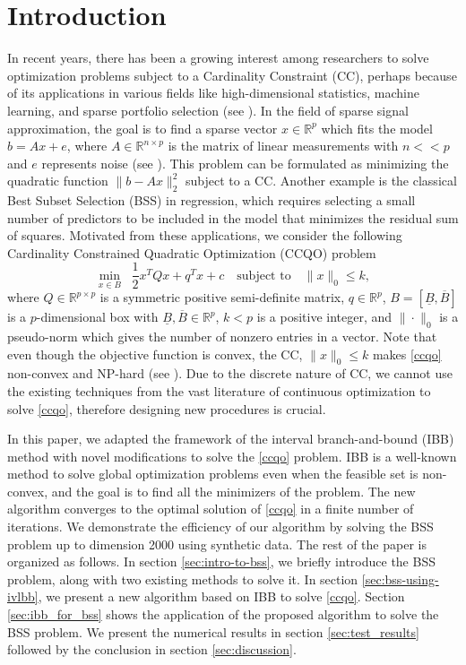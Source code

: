 \documentclass[10pt, letterpaper]{article}
\begin{document}
\section{Introduction}
In recent years, there has been a growing interest among researchers to solve optimization problems subject to a Cardinality Constraint (CC), perhaps because of its applications in various fields like high-dimensional statistics, machine learning, and sparse portfolio selection (see \cite{tillman2024cardinality}). 
In the field of sparse signal approximation, the goal is to find a sparse vector $x \in \mathbb{R}^{p}$ which fits the model $b=Ax+e$, where $A\in \mathbb{R}^{n \times p}$ is the matrix of linear measurements with $n << p$ and $e$ represents noise (see \cite{blumensath2008iterative}). This problem can be formulated as minimizing the quadratic function $\|b-Ax \|_{2}^{2}$ subject to a CC. Another example is the classical Best Subset Selection (BSS) in regression, which requires selecting a small number of predictors to be included in the model that minimizes the residual sum of squares. Motivated from these applications, we 
consider the following Cardinality Constrained Quadratic Optimization (CCQO) problem
\begin{equation}\label{ccqo}
    \min_{x \in B } \;\; \frac{1}{2}x^{T}Q x + q^{T}x +c \quad \text{subject to} \quad \|x\|_{0} \leq k, \tag{CCQO}
\end{equation}
where $ Q \in \mathbb{R}^{p \times p}$ is a symmetric positive semi-definite matrix, $q \in \mathbb{R}^{p}$, $B=[\underline{B},\overline{B}]$ is a $p$-dimensional box with $\underline{B},\overline{B}\in \mathbb{R}^{p}$, $k<p$ is a positive integer, and $\|\cdot\|_{0}$ is a pseudo-norm which gives the number of nonzero entries in a vector.
Note that even though the objective function is convex, the CC, $\|x\|_{0} \leq k$ makes \eqref{ccqo} non-convex and NP-hard (see \cite{natarajan1995sparse}). Due to the discrete nature of CC, we cannot use the existing techniques from the vast literature of continuous optimization to solve \eqref{ccqo}, therefore designing new procedures is crucial. 

In this paper, we adapted the framework of the interval branch-and-bound (IBB) method with novel modifications to solve the \eqref{ccqo} problem. IBB is a well-known method to solve global optimization problems even when the feasible set is non-convex, and the goal is to find all the minimizers of the problem. The new algorithm converges to the optimal solution of \eqref{ccqo} in a finite number of iterations. We demonstrate the efficiency of our algorithm by solving the BSS problem up to dimension 2000 using synthetic data.
The rest of the paper is organized as follows. In section \ref{sec:intro-to-bss}, we briefly introduce the BSS problem, along with two existing methods to solve it. 
In section \ref{sec:bss-using-ivlbb}, we present a new algorithm based on IBB to solve \eqref{ccqo}. Section \ref{sec:ibb_for_bss} shows the application of the proposed algorithm to solve the BSS problem. We present the numerical results in section \ref{sec:test_results} followed by the conclusion in section \ref{sec:discussion}.
\end{document}
